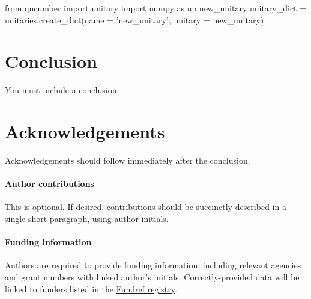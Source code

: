 \documentclass[submission, Phys]{SciPost}
\begin{document}
\begin{python}
from qucumber import unitary
import numpy as np
new_unitary
unitary_dict = unitaries.create_dict(name = 'new_unitary', unitary = new_unitary)
\end{python}

\section{Conclusion}
You must include a conclusion.

\section*{Acknowledgements}
Acknowledgements should follow immediately after the conclusion.

\paragraph{Author contributions}
This is optional. If desired, contributions should be succinctly described in a single short paragraph, using author initials.

\paragraph{Funding information}
Authors are required to provide funding information, including relevant agencies and grant numbers with linked author's initials. Correctly-provided data will be linked to funders listed in the \href{https://www.crossref.org/services/funder-registry/}{\sf Fundref registry}.
\end{document}
